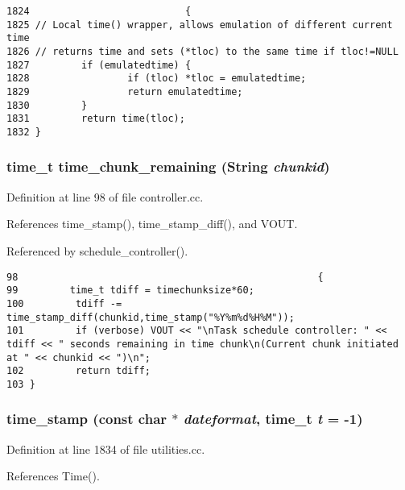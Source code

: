 \footnotesize\begin{verbatim}1824                           {
1825 // Local time() wrapper, allows emulation of different current time
1826 // returns time and sets (*tloc) to the same time if tloc!=NULL
1827         if (emulatedtime) {
1828                 if (tloc) *tloc = emulatedtime;
1829                 return emulatedtime;
1830         }
1831         return time(tloc);
1832 }
\end{verbatim}\normalsize 
{}
\subsubsection{\setlength{\rightskip}{0pt plus 5cm}time\_\-t time\_\-chunk\_\-remaining ({\bf String} {\em chunkid})\hspace{0.3cm}{\tt  [inline]}}\label{dil2al_8hh_a340}




Definition at line 98 of file controller.cc.

References time\_\-stamp(), time\_\-stamp\_\-diff(), and VOUT.

Referenced by schedule\_\-controller().



\footnotesize\begin{verbatim}98                                                    {
99         time_t tdiff = timechunksize*60;
100         tdiff -= time_stamp_diff(chunkid,time_stamp("%Y%m%d%H%M"));
101         if (verbose) VOUT << "\nTask schedule controller: " << tdiff << " seconds remaining in time chunk\n(Current chunk initiated at " << chunkid << ")\n";
102         return tdiff;
103 }
\end{verbatim}\normalsize 
{}
\subsubsection{ time\_\-stamp (const char $\ast$ {\em dateformat}, time\_\-t {\em t} = -1)}\label{dil2al_8hh_a218}




Definition at line 1834 of file utilities.cc.

References Time().

